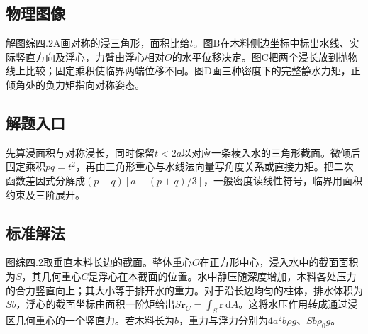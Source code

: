 \documentclass[UTF8,fontset=fandol,a4paper,11pt]{ctexart}
\begin{document}


\subsection*{物理图像}

解图综四.2A画对称的浸三角形，面积比给$t$。图B在木料侧边坐标中标出水线、实际竖直方向及浮心，力臂由浮心相对$O$的水平位移决定。图C把两个浸长放到抛物线上比较；固定乘积使临界两端位移不同。图D画三种密度下的完整静水力矩，正倾角处的负力矩指向对称姿态。



\subsection*{解题入口}

先算浸面积与对称浸长，同时保留$t<2a$以对应一条棱入水的三角形截面。微倾后固定乘积$pq=t^2$，再由三角形重心与水线法向量写角度关系或直接力矩。把二次函数差因式分解成$(p-q)[a-(p+q)/3]$，一般密度读线性符号，临界用面积约束及三阶展开。



\subsection*{标准解法}


图综四.2取垂直木料长边的截面。整体重心$O$在正方形中心，浸入水中的截面面积为$S$，其几何重心$C$是浮心在本截面的位置。水中静压随深度增加，木料各处压力的合力竖直向上；其大小等于排开水的重力。对于沿长边均匀的柱体，排水体积为$Sb$，浮心的截面坐标由面积一阶矩给出$S\boldsymbol r_C=\int_S\boldsymbol r\,\mathrm dA$。这将水压作用转成通过浸区几何重心的一个竖直力。若木料长为$b$，重力与浮力分别为$4a^2b\rho g$、$Sb\rho_0g$。
\end{document}

